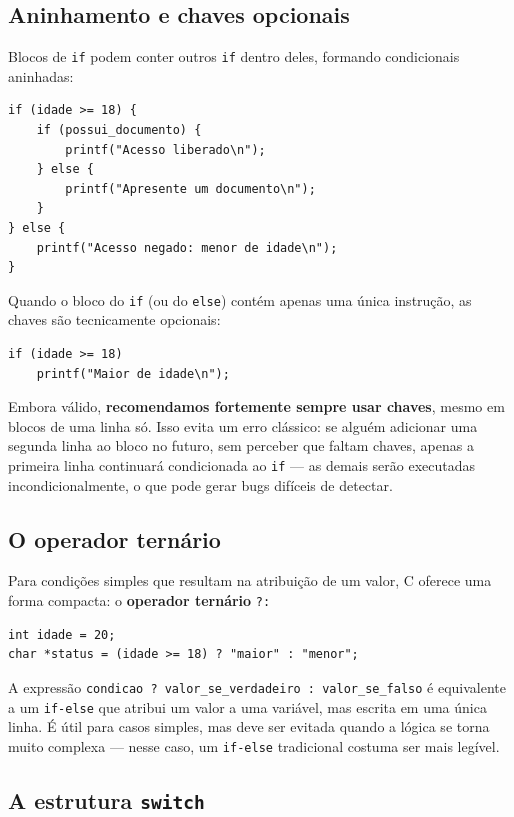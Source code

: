 \documentclass[12pt,a4paper,oneside]{extreport}
\begin{document}
\subsection{Aninhamento e chaves opcionais}

Blocos de \texttt{if} podem conter outros \texttt{if} dentro deles, formando condicionais aninhadas:

\begin{lstlisting}
if (idade >= 18) {
    if (possui_documento) {
        printf("Acesso liberado\n");
    } else {
        printf("Apresente um documento\n");
    }
} else {
    printf("Acesso negado: menor de idade\n");
}
\end{lstlisting}

Quando o bloco do \texttt{if} (ou do \texttt{else}) contém apenas uma única instrução, as chaves são tecnicamente opcionais:

\begin{lstlisting}
if (idade >= 18)
    printf("Maior de idade\n");
\end{lstlisting}

Embora válido, \textbf{recomendamos fortemente sempre usar chaves}, mesmo em blocos de uma linha só. Isso evita um erro clássico: se alguém adicionar uma segunda linha ao bloco no futuro, sem perceber que faltam chaves, apenas a primeira linha continuará condicionada ao \texttt{if} — as demais serão executadas incondicionalmente, o que pode gerar bugs difíceis de detectar.

\subsection{O operador ternário}

Para condições simples que resultam na atribuição de um valor, C oferece uma forma compacta: o \textbf{operador ternário} \texttt{?:}

\begin{lstlisting}
int idade = 20;
char *status = (idade >= 18) ? "maior" : "menor";
\end{lstlisting}

A expressão \texttt{condicao ? valor\_se\_verdadeiro : valor\_se\_falso} é equivalente a um \texttt{if-else} que atribui um valor a uma variável, mas escrita em uma única linha. É útil para casos simples, mas deve ser evitada quando a lógica se torna muito complexa — nesse caso, um \texttt{if-else} tradicional costuma ser mais legível.

\subsection{A estrutura \texttt{switch}}
\end{document}
